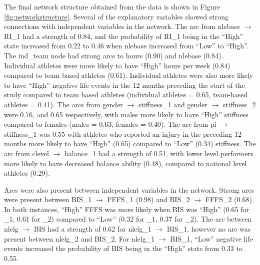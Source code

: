 \documentclass[
  english,
  man,floatsintext]{apa6}
\begin{document}
The final network structure obtained from the data is shown in Figure \ref{fig:networkstructure}. Several of the explanatory variables showed strong connections with independent variables in the network.
The arc from nlebase \(\rightarrow\) RI\_1 had a strength of 0.84, and the probability of RI\_1 being in the \enquote{High} state increased from 0.22 to 0.46 when nlebase increased from \enquote{Low} to \enquote{High}.
The ind\_team node had strong arcs to hours (0.90) and nlebase (0.84).
Individual athletes were more likely to have \enquote{High} hours per week (0.84) compared to team-based athletes (0.61).
Individual athletes were also more likely to have \enquote{High} negative life events in the 12 months preceding the start of the study compared to team based athletes (individual athletes = 0.65, team-based athletes = 0.41).
The arcs from gender \(\rightarrow\) stiffness\_1 and gender \(\rightarrow\) stiffness\_2 were 0.76, and 0.65 respectively, with males more likely to have \enquote{High} stiffness compared to females (males = 0.63, females = 0.40).
The arc from pi \(\rightarrow\) stiffness\_1 was 0.55 with athletes who reported an injury in the preceding 12 months more likely to have \enquote{High} (0.65) compared to \enquote{Low} (0.34) stiffness.
The arc from clevel \(\rightarrow\) balance\_1 had a strength of 0.51, with lower level performers more likely to have decreased balance ability (0.48), compared to national level athletes (0.29).

Arcs were also present between independent variables in the network. Strong arcs were present between BIS\_1 \(\rightarrow\) FFFS\_1 (0.98) and BIS\_2 \(\rightarrow\) FFFS\_2 (0.68).
In both instances, \enquote{High} FFFS was more likely when BIS was \enquote{High} (0.65 for \_1, 0.61 for \_2) compared to \enquote{Low} (0.32 for \_1, 0.37 for \_2).
The arc between nlelg \(\rightarrow\) BIS had a strength of 0.62 for nlelg\_1 \(\rightarrow\) BIS\_1, however no arc was present between nlelg\_2 and BIS\_2.
For nlelg\_1 \(\rightarrow\) BIS\_1, \enquote{Low} negative life events increased the probability of BIS being in the \enquote{High} state from 0.33 to 0.55.
\end{document}
